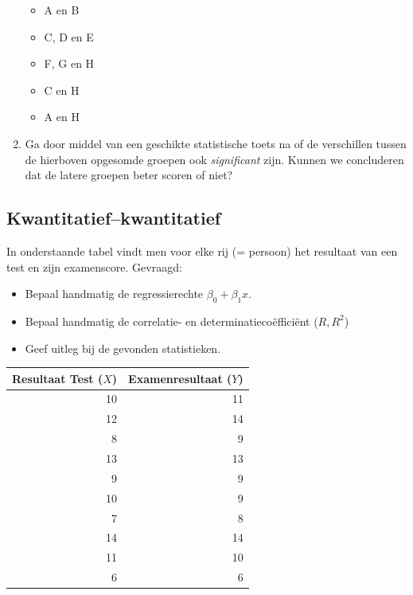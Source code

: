 \begin{exercise}
\begin{enumerate}
    \begin{itemize}
      \item A en B
      \item C, D en E
      \item F, G en H
      \item C en H
      \item A en H
    \end{itemize}
    
    \item Ga door middel van een geschikte statistische toets na of de verschillen tussen de hierboven opgesomde groepen ook \emph{significant} zijn. Kunnen we concluderen dat de latere groepen beter scoren of niet?
  \end{enumerate}
\end{exercise}

\subsection{Kwantitatief--kwantitatief}
\label{ssec:oef-kwant-kwant}

\begin{exercise}
  \label{ex:test-examen}
  In onderstaande tabel vindt men voor elke rij (= persoon) het resultaat van een test en zijn examenscore. Gevraagd:
  \begin{itemize}
    \item Bepaal handmatig de regressierechte $\beta_{0} + \beta_{1} x$. 
    \item Bepaal handmatig de correlatie- en determinatieco\"effici\"ent ($R, R^{2}$) 
    \item Geef uitleg bij de gevonden statistieken.
  \end{itemize}
  
  \centering
  \begin{tabular}{@{}rr@{}} \toprule
    Resultaat Test ($X$) & Examenresultaat ($Y$) \\
    \midrule
    10 & 11 \\
    12 & 14 \\
    8 & 9 \\
    13 & 13 \\
    9 & 9 \\
    10 &  9 \\
    7 & 8 \\
    14 & 14 \\
    11 & 10 \\
    6 & 6  \\
    \bottomrule
  \end{tabular}
  \label{tab:testExamen}
\end{exercise}

